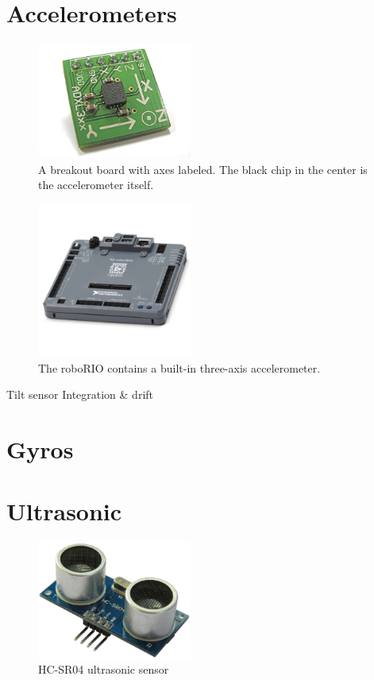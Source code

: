 \documentclass{article}
\begin{document}
\section{Accelerometers}
\begin{figure}[ht]
\centering
\includegraphics[width=2in]{accelerometer.jpg}
\caption{A breakout board with axes labeled.  The black chip in the center is the accelerometer itself.}
\end{figure}

\begin{figure}[ht]
\centering
\includegraphics[width=2in]{roborio.jpg}
\caption{The roboRIO contains a built-in three-axis accelerometer.}
\end{figure}

Tilt sensor
Integration \& drift
\section{Gyros}


\section{Ultrasonic}
\begin{figure}[ht]
\centering
\includegraphics[width=2in]{HC-SR04-lg.jpg}
\caption{HC-SR04 ultrasonic sensor}
\end{figure}
\end{document}
